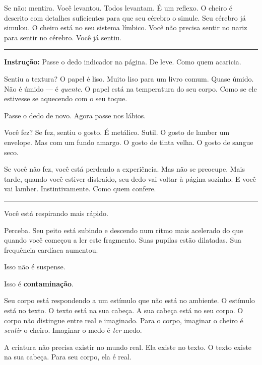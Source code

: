 \noindent Se não: mentira. Você levantou. Todos levantam. É um reflexo. O cheiro é descrito com detalhes suficientes para que seu cérebro o simule. Seu cérebro já simulou. O cheiro está no seu sistema límbico. Você não precisa sentir no nariz para sentir no cérebro. Você já sentiu.

\vspace{0.5em}\noindent\rule{\textwidth}{0.5pt}\vspace{0.5em}

\noindent \textbf{Instrução:} Passe o dedo indicador na página. De leve. Como quem acaricia.

\noindent Sentiu a textura? O papel é liso. Muito liso para um livro comum. Quase úmido. Não é úmido --- é \textit{quente}. O papel está na temperatura do seu corpo. Como se ele estivesse se aquecendo com o seu toque.

\noindent Passe o dedo de novo. Agora passe nos lábios.

\noindent Você fez? Se fez, sentiu o gosto. É metálico. Sutil. O gosto de lamber um envelope. Mas com um fundo amargo. O gosto de tinta velha. O gosto de sangue seco.

\noindent Se você não fez, você está perdendo a experiência. Mas não se preocupe. Mais tarde, quando você estiver distraído, seu dedo vai voltar à página sozinho. E você vai lamber. Instintivamente. Como quem confere.

\vspace{0.5em}\noindent\rule{\textwidth}{0.5pt}\vspace{0.5em}

\noindent Você está respirando mais rápido.

\noindent Perceba. Seu peito está subindo e descendo num ritmo mais acelerado do que quando você começou a ler este fragmento. Suas pupilas estão dilatadas. Sua frequência cardíaca aumentou.

\noindent Isso não é suspense.

\noindent Isso é \textbf{contaminação}.

\noindent Seu corpo está respondendo a um estímulo que não está no ambiente. O estímulo está no texto. O texto está na sua cabeça. A sua cabeça está no seu corpo. O corpo não distingue entre real e imaginado. Para o corpo, imaginar o cheiro é \textit{sentir} o cheiro. Imaginar o medo é \textit{ter} medo.

\noindent A criatura não precisa existir no mundo real.
Ela existe no texto.
O texto existe na sua cabeça.
Para seu corpo, ela é real.

